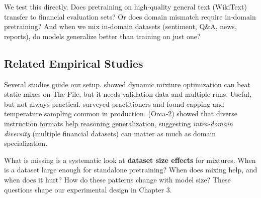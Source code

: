 We test this directly. Does pretraining on high‑quality general text (WikiText) transfer to financial evaluation sets? Or does domain mismatch require in‑domain pretraining? And when we mix in‑domain datasets (sentiment, Q\&A, news, reports), do models generalize better than training on just one?

\subsection{Related Empirical Studies}

Several studies guide our setup. \textcite{xie2023doremi} showed dynamic mixture optimization can beat static mixes on The Pile, but it needs validation data and multiple runs. Useful, but not always practical. \textcite{longpre2023pretrainer} surveyed practitioners and found capping and temperature sampling common in production. \textcite{mitra2023orca2} (Orca‑2) showed that diverse instruction formats help reasoning generalization, suggesting \textit{intra‑domain diversity} (multiple financial datasets) can matter as much as domain specialization.

What is missing is a systematic look at \textbf{dataset size effects} for mixtures. When is a dataset large enough for standalone pretraining? When does mixing help, and when does it hurt? How do these patterns change with model size? These questions shape our experimental design in Chapter 3.
